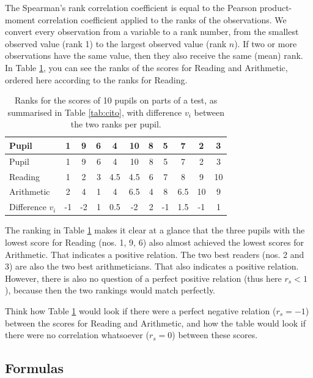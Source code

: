 \documentclass[
]{book}
\begin{document}
The Spearman's rank correlation coefficient is equal to the Pearson
product-moment correlation coefficient applied to the ranks of
the observations. We convert every observation from a variable to
a rank number, from the smallest observed value (rank 1)
to the largest observed value (rank \(n\)). If two or more observations
have the same value, then they also receive the same
(mean) rank. In
Table \ref{tab:cito-ranks}, you can see the ranks of the scores for Reading
and Arithmetic, ordered here according to the ranks for Reading.

\begin{longtable}[]{@{}lccrccrcccc@{}}
\caption{\label{tab:cito-ranks} Ranks for the scores of 10 pupils on parts of a test, as summarised in
Table \ref{tab:cito}, with difference \(v_i\) between the two ranks per pupil.}\tabularnewline
\toprule\noalign{}
Pupil & 1 & 9 & 6 & 4 & 10 & 8 & 5 & 7 & 2 & 3 \\
\midrule\noalign{}
\endfirsthead
\toprule\noalign{}
Pupil & 1 & 9 & 6 & 4 & 10 & 8 & 5 & 7 & 2 & 3 \\
\midrule\noalign{}
\endhead
\bottomrule\noalign{}
\endlastfoot
Reading & 1 & 2 & 3 & 4.5 & 4.5 & 6 & 7 & 8 & 9 & 10 \\
Arithmetic & 2 & 4 & 1 & 4 & 6.5 & 4 & 8 & 6.5 & 10 & 9 \\
Difference \(v_i\) & -1 & -2 & 1 & 0.5 & -2 & 2 & -1 & 1.5 & -1 & 1 \\
\end{longtable}

The ranking in Table \ref{tab:cito-ranks} makes it clear at a glance that
the three pupils with the lowest score for Reading (nos. 1, 9, 6) also almost achieved
the lowest scores for Arithmetic. That indicates a positive
relation. The two best readers (nos. 2 and 3) are also the two best
arithmeticians. That also indicates a positive relation. However, there is
also no question of a perfect positive relation (thus here \(r_s<1\)), because
then the two rankings would match perfectly.

Think how Table \ref{tab:cito-ranks} would look if there were a perfect
negative relation (\(r_s=-1\)) between the scores for Reading and
Arithmetic, and how the table would look if there were no correlation whatsoever
(\(r_s=0\)) between these scores.

\hypertarget{formulas-4}{%
\subsection{Formulas}\label{formulas-4}}
\end{document}
